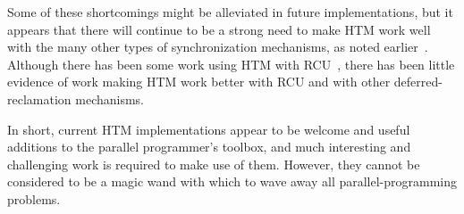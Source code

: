Some of these shortcomings might be alleviated in future implementations,
but it appears that there will continue to be a strong need to make
HTM work well with the many other types of synchronization mechanisms,
as noted earlier~\cite{McKenney2007PLOSTM,PaulEMcKenney2010OSRGrassGreener}.
Although there has been some work using HTM with
RCU~\cite{Siakavaras2017CombiningHA,DimitriosSiakavaras2020RCU-HTM-B+Trees,ChristinaGiannoula2018HTM-RCU-graphcoloring,SeongJaePark2020HTMRCUlock},
there has been little evidence of work making HTM work better with
RCU and with other deferred-reclamation mechanisms.

In short, current HTM implementations appear to be welcome and useful
additions to the parallel programmer's toolbox, and much interesting
and challenging work is required to make use of them.
However, they cannot be
considered to be a magic wand with which to wave away all parallel-programming
problems.
